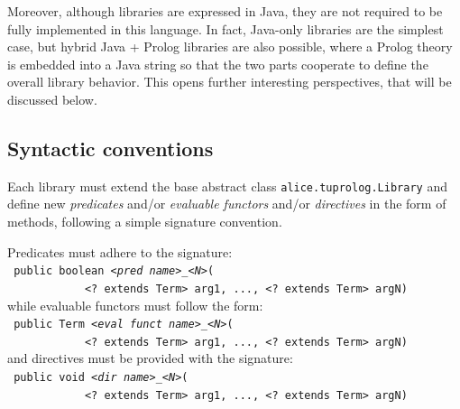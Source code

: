 Moreover, although \tuprolog{} libraries are expressed in Java, they are not required to
be fully implemented in this language.
%
In fact, Java-only libraries are the simplest case, but hybrid Java + Prolog libraries are also possible, where a Prolog theory is embedded into a Java string so that the
two parts cooperate to define the overall library behavior.
This opens further interesting perspectives, that will be discussed below.

\subsection{Syntactic conventions}
\label{ssec:library-syntax}
Each library must extend the base abstract class \texttt{alice.tuprolog.Library} and define new \textit{predicates} and/or \textit{evaluable functors} and/or \textit{directives} in the form of methods, following a simple signature convention.

\noindent Predicates must adhere to the signature:\\

{\small\tt
    public boolean <\textit{pred name}>\_<\textit{N}>(\\
    \mbox{~~~~~~~~~~~~}<?~extends~Term> arg1, ..., <?~extends~Term> argN)
}\\

\noindent while evaluable functors must follow the form:\\

{\small\tt
    public Term <\textit{eval funct name}>\_<\textit{N}>(\\
    \mbox{~~~~~~~~~~~~}<?~extends~Term> arg1, ..., <?~extends~Term> argN)
}\\

\noindent and directives must be provided with the signature:\\

{\small\tt
    public void <\textit{dir name}>\_<\textit{N}>(\\
    \mbox{~~~~~~~~~~~~}<?~extends~Term> arg1, ..., <?~extends~Term> argN)
}\\

